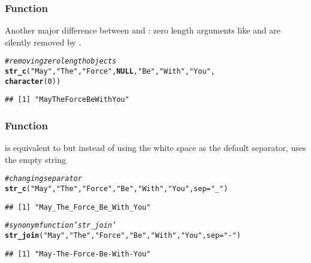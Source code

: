 \documentclass[12pt]{beamer}\usepackage[]{graphicx}\usepackage[]{color}
\makeatletter
\newcommand{\hlnum}[1]{\textcolor[rgb]{0.686,0.059,0.569}{#1}}%
\newcommand{\hlstr}[1]{\textcolor[rgb]{0.192,0.494,0.8}{#1}}%
\newcommand{\hlcom}[1]{\textcolor[rgb]{0.678,0.584,0.686}{\textit{#1}}}%
\newcommand{\hlstd}[1]{\textcolor[rgb]{0.345,0.345,0.345}{#1}}%
\newcommand{\hlkwa}[1]{\textcolor[rgb]{0.161,0.373,0.58}{\textbf{#1}}}%
\newcommand{\hlkwc}[1]{\textcolor[rgb]{0.333,0.667,0.333}{#1}}%
\newcommand{\hlkwd}[1]{\textcolor[rgb]{0.737,0.353,0.396}{\textbf{#1}}}%
\newenvironment{kframe}{%
 \def\at@end@of@kframe{}%
 \ifinner\ifhmode%
  \def\at@end@of@kframe{\end{minipage}}%
  \begin{minipage}{\columnwidth}%
 \fi\fi%
 \def\FrameCommand##1{\hskip\@totalleftmargin \hskip-\fboxsep
 \colorbox{shadecolor}{##1}\hskip-\fboxsep
     \hskip-\linewidth \hskip-\@totalleftmargin \hskip\columnwidth}%
 \MakeFramed {\advance\hsize-\width
   \@totalleftmargin\z@ \linewidth\hsize
   \@setminipage}}%
 {\par\unskip\endMakeFramed%
 \at@end@of@kframe}
\newenvironment{knitrout}{}{} %
\makeatother
\begin{document}
\begin{frame}[fragile]
\frametitle{Function }

Another major difference between  and : zero length arguments like  and  are silently removed by .

\begin{knitrout}\footnotesize
{}\color{fgcolor}\begin{kframe}
\begin{alltt}
\hlcom{# removing zero length objects}
\hlkwd{str_c}\hlstd{(}\hlstr{"May"}\hlstd{,} \hlstr{"The"}\hlstd{,} \hlstr{"Force"}\hlstd{,} \hlkwa{NULL}\hlstd{,} \hlstr{"Be"}\hlstd{,} \hlstr{"With"}\hlstd{,} \hlstr{"You"}\hlstd{,}
      \hlkwd{character}\hlstd{(}\hlnum{0}\hlstd{))}
\end{alltt}
\begin{verbatim}
## [1] "MayTheForceBeWithYou"
\end{verbatim}
\end{kframe}
\end{knitrout}

\end{frame}


\begin{frame}[fragile]
\frametitle{Function }

 is equivalent to  but instead of using the white space as the default separator,  uses the empty string 
\begin{knitrout}\footnotesize
{}\color{fgcolor}\begin{kframe}
\begin{alltt}
\hlcom{# changing separator}
\hlkwd{str_c}\hlstd{(}\hlstr{"May"}\hlstd{,} \hlstr{"The"}\hlstd{,} \hlstr{"Force"}\hlstd{,} \hlstr{"Be"}\hlstd{,} \hlstr{"With"}\hlstd{,} \hlstr{"You"}\hlstd{,} \hlkwc{sep}\hlstd{=}\hlstr{"_"}\hlstd{)}
\end{alltt}
\begin{verbatim}
## [1] "May_The_Force_Be_With_You"
\end{verbatim}
\begin{alltt}
\hlcom{# synonym function 'str_join'}
\hlkwd{str_join}\hlstd{(}\hlstr{"May"}\hlstd{,} \hlstr{"The"}\hlstd{,} \hlstr{"Force"}\hlstd{,} \hlstr{"Be"}\hlstd{,} \hlstr{"With"}\hlstd{,} \hlstr{"You"}\hlstd{,} \hlkwc{sep}\hlstd{=}\hlstr{"-"}\hlstd{)}
\end{alltt}


{\ttfamily\noindent{}}\begin{verbatim}
## [1] "May-The-Force-Be-With-You"
\end{verbatim}
\end{kframe}
\end{knitrout}

\end{frame}
\end{document}
